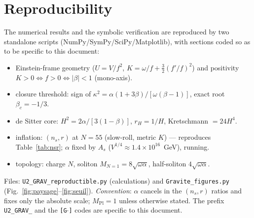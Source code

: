 \documentclass[11pt,a4paper]{article}
\newcommand{\Mpl}{M_{\mathrm{Pl}}}
\theoremstyle{plain}
\theoremstyle{remark}
\begin{document}
\section*{Reproducibility}
The numerical results and the symbolic verification are reproduced by two standalone scripts
(NumPy/SymPy/SciPy/Matplotlib), with sections coded so as to be specific to this document:
\begin{itemize}
\item[{\texttt{[G1]}}] Einstein-frame geometry ($U=V/f^2$, $K=\omega/f+\tfrac32(f'/f)^2$) and positivity $K>0\Leftrightarrow f>0\Leftrightarrow|\beta|<1$ (mono-axis).
\item[{\texttt{[G2]}}] closure threshold: sign of $\kappa^2=\alpha(1+3\beta)/[\omega(\beta-1)]$, exact root $\beta_c=-1/3$.
\item[{\texttt{[G3]}}] de Sitter core: $H^2=2\alpha/[3(1-\beta)]$, $r_H=1/H$, Kretschmann $=24H^4$.
\item[{\texttt{[G4]}}] inflation: $(n_s,r)$ at $N=55$ (slow-roll, metric $K$) --- reproduces Table~\ref{tab:nsr}; $\alpha$ fixed by $A_s$ ($V^{1/4}\approx1.4\times10^{16}$~GeV), running.
\item[{\texttt{[G5]}}] topology: charge $N$, soliton $M_{N=1}=8\sqrt{\omega\alpha}$, half-soliton $4\sqrt{\omega\alpha}$.
\end{itemize}
Files: \texttt{U2\_GRAV\_reproductible.py} (calculations) and \texttt{Gravite\_figures.py}
(Fig.~\ref{fig:paysage}--\ref{fig:seuil}). \emph{Convention}: $\alpha$ cancels in the
$(n_s,r)$ ratios and fixes only the absolute scale; $\Mpl=1$ unless otherwise stated. The
prefix \texttt{U2\_GRAV\_} and the \texttt{[G$\cdot$]} codes are specific to this document.
\end{document}
